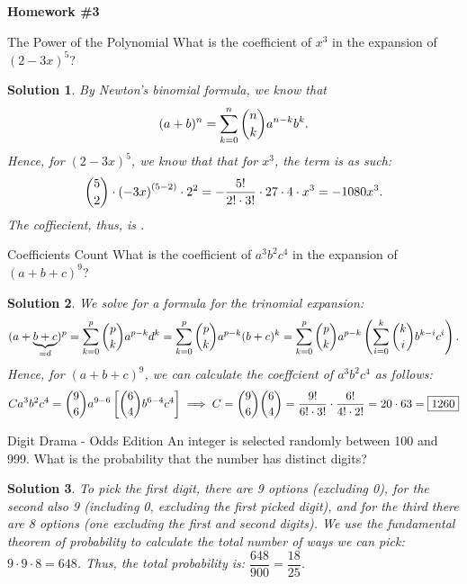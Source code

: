 \documentclass[11pt]{article}
\newtheorem*{solution}{Solution}
\theoremstyle{mystyle}
\newcommand{\psettitle}[1]{
    \begin{center}
    \huge \textbf{#1}
    \end{center}
}
\begin{document}
\psettitle{Homework \#3}

\noindent

\begin{psproblem}{The Power of the Polynomial}{}
What is the coefficient of $x^3$ in the expansion of ${(2-3x)}^5$?
\end{psproblem}

\begin{solution}
By Newton's binomial formula, we know that \[(a + b)^n = \sum_{k=0}^{n} \dbinom{n}{k} a^{n-k} b^k .\]
Hence, for $(2-3x)^5$, we know that that for $x^3$, the term is as such: $$\dbinom{5}{2} \cdot {(-3x)}^{(5-2)} \cdot 2^2 =  -\dfrac{5!}{2!\cdot3!} \cdot 27 \cdot 4 \cdot x^3=-1080x^3.$$
The coffiecient, thus, is .
\end{solution}

\begin{psproblem}{Coefficients Count}{}
What is the coefficient of $a^3b^2c^4$ in the expansion of $(a + b + c)^9$?
\end{psproblem}

\begin{solution}
We solve for a formula for the trinomial expansion:
\[(a+\underbrace{b+c}_{=d})^p = \sum_{k=0}^{p} \dbinom{p}{k} a^{p-k} d^k = 
\sum_{k=0}^{p} \dbinom{p}{k} a^{p-k} (b+c)^{k} =
\sum_{k=0}^{p} \dbinom{p}{k} a^{p-k} \left( \sum_{i=0}^{k} \dbinom{k}{i} b^{k-i} c^{i} \right).
\]
Hence, for $(a+b+c)^9$, we can calculate the coeffcient of $a^3b^2c^4$ as follows: 
\[
Ca^3b^2c^4=\dbinom{9}{6}a^{9-6} \left[ \dbinom{6}{4}b^{6-4}c^4 \right] \implies C=\dbinom{9}{6}\dbinom{6}{4}=\dfrac{9!}{6!\cdot3!} \cdot \dfrac{6!}{4!\cdot2!}=20 \cdot 63=\boxed{1260}
\]
\end{solution}

\begin{psproblem}{Digit Drama - Odds Edition}{}
An integer is selected randomly between 100 and 999. What is the probability that the number has distinct digits?
\end{psproblem}

\begin{solution}
To pick the first digit, there are 9 options (excluding 0), for the second also 9 (including 0, excluding the first picked digit), and for the third there are 8 options (one excluding the first and second digits). We use the fundamental theorem of probability to calculate the total number of ways we can pick: $9 \cdot 9 \cdot 8 = 648$. Thus, the total probability is: $\dfrac{648}{900}=\boxed{\dfrac{18}{25}}$.
\end{solution}
\end{document}
